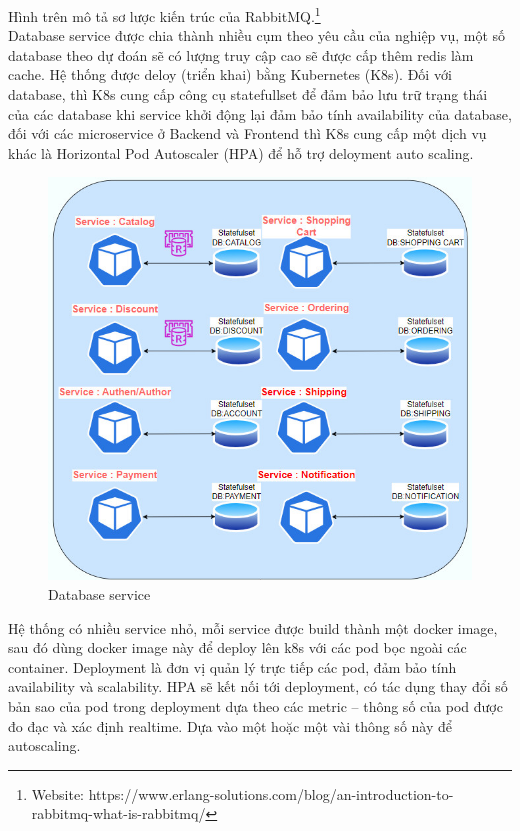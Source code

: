 \noindent Hình trên mô tả sơ lược kiến trúc của RabbitMQ.\footnote{Website: https://www.erlang-solutions.com/blog/an-introduction-to-rabbitmq-what-is-rabbitmq/}\\[0.5cm]
\noindent Database service được chia thành nhiều cụm theo yêu cầu của nghiệp vụ, một số database theo dự đoán sẽ có lượng truy cập cao sẽ được cấp thêm redis làm cache. Hệ thống được deloy (triển khai) bằng Kubernetes (K8s). Đối với database, thì K8s cung cấp công cụ statefullset để đảm bảo lưu trữ trạng thái của các database khi service khởi động lại đảm bảo tính availability của database, đối với các microservice ở Backend và Frontend thì K8s cung cấp một dịch vụ khác là Horizontal Pod Autoscaler (HPA) để hỗ trợ deloyment auto scaling.
 \begin{figure}[H]
    \begin{center}
    \includegraphics[scale = 0.7]{images/phat/DB_service.jpg}
    \vspace*{7mm}
    \caption{Database service}
    \end{center}
    \label{}
\end{figure}
\noindent Hệ thống có nhiều service nhỏ, mỗi service được build thành một docker image, sau đó dùng docker image này để deploy lên k8s với các pod bọc ngoài các container. Deployment là đơn vị quản lý trực tiếp các pod, đảm bảo tính availability và scalability. HPA sẽ kết nối tới deployment, có tác dụng thay đổi số bản sao của pod trong deployment dựa theo các metric – thông số của pod được đo đạc và xác định realtime. Dựa vào một hoặc một vài thông số này để autoscaling.

